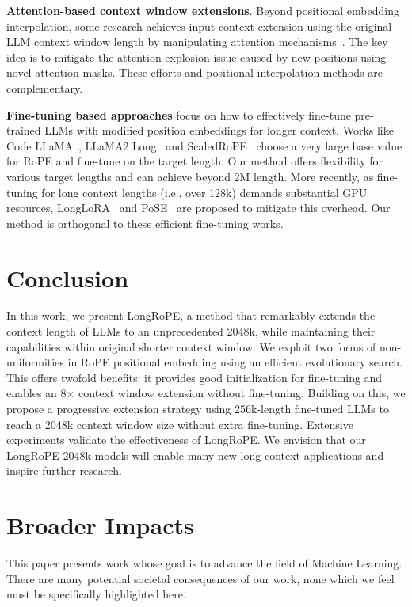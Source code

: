 \textbf{Attention-based context window extensions}. Beyond positional embedding interpolation, some research achieves input context extension using the original LLM context window length by manipulating attention mechanisms~\cite{han2023lminfinite, streamingllm,parallelwindow}. The key idea is to mitigate the attention explosion issue caused by new positions using novel attention masks. These efforts and positional interpolation methods are  complementary.

\textbf{Fine-tuning based approaches} focus on how  to effectively fine-tune pre-trained LLMs with modified position embeddings for longer context. Works like Code LLaMA~\cite{codellama}, LLaMA2 Long~\cite{xiong2023effective} and ScaledRoPE~\cite{liu2023scaling} choose a very large base value for RoPE and fine-tune on the target length. Our method offers flexibility for various target lengths and can achieve beyond 2M length.  More recently, as fine-tuning for long context lengths (i.e., over 128k) demands substantial GPU resources,  LongLoRA~\cite{longlora} and PoSE~\cite{zhu2023pose} are proposed to mitigate this overhead. Our method is orthogonal to these efficient fine-tuning works.

\section{Conclusion}

In this work, we present LongRoPE, a method that remarkably extends the context length of LLMs to an unprecedented 2048k, while maintaining their  capabilities within original shorter context window. We exploit two forms of non-uniformities in RoPE positional embedding using an efficient evolutionary search. This  offers twofold benefits: it provides good  initialization for fine-tuning and enables an 8$\times$ context window extension without fine-tuning. Building on this, we  propose a progressive extension strategy using 256k-length fine-tuned LLMs to reach a 2048k context window size without extra fine-tuning. Extensive experiments validate the effectiveness of LongRoPE. We envision that our LongRoPE-2048k models will enable many new long context applications and inspire further research. 

\section*{Broader Impacts} This paper presents work whose goal is to advance the field of Machine Learning. There are many potential societal consequences of our work, none which we feel must be specifically highlighted here.

	\balance

